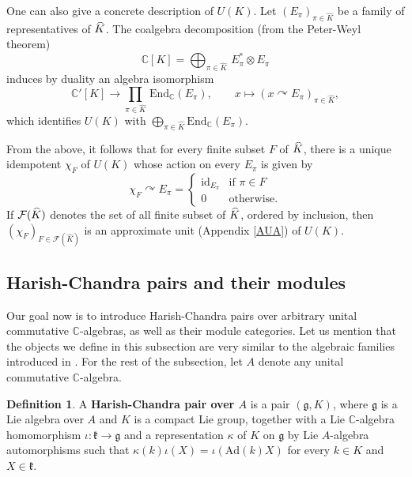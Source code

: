 \documentclass{amsart}
\theoremstyle{definition}
\newtheorem{definition}[theorem]{Definition}
\newcommand{\hatcpt}[1]{
  \vphantom{#1}\smash[t]{\widehat{#1}}
}
\begin{document}
One can also give a concrete description of $U(K)$. Let $(E_\pi)_{\pi \in \widehat{K}}$ be a family of representatives of $\hatcpt{K}$. The coalgebra decomposition (from the Peter-Weyl theorem)
\[
    \mathbb{C}[K] = \bigoplus_{\pi \in \widehat{K}}\, E_\pi^* \otimes E_\pi
\]
induces by duality an algebra isomorphism
\[ \mathbb{C}'[K] \to \prod_{\pi \in \widehat{K}} \, \mathrm{End}_\mathbb{C}(E_\pi),\qquad x \mapsto (x \curvearrowright E_\pi)_{\pi \in \widehat{K}},\]
which identifies $U(K)$ with $\bigoplus_{\pi \in \widehat{K}} \mathrm{End}_\mathbb{C}(E_\pi)$.

From the above, it follows that for every finite subset $F$ of $\hatcpt{K}$, there is a unique idempotent $\chi_F$ of $U(K)$ whose action on every $E_\pi$ is given by
\begin{equation}\chi_F \curvearrowright E_\pi = \begin{cases}
    \mathrm{id}_{E_\pi} & \text{if $\pi \in F$}\\
    0 & \text{otherwise.}
\end{cases}\end{equation}
If $\mathcal{F}(\hatcpt{K})$ denotes the set of all finite subset of $\hatcpt{K}$, ordered by inclusion, then $(\chi_{F})_{F \in \mathcal{F}(\widehat{K})}$ is an approximate unit (Appendix \ref{AUA}) of $U(K)$.

\subsection{Harish-Chandra pairs and their modules}\label{gKmods} Our goal now is to introduce Harish-Chandra pairs over arbitrary unital commutative $\mathbb{C}$-algebras, as well as their module categories. Let us mention that the objects we define in this subsection are very similar to the algebraic families introduced in \cite{BHS}. For the rest of the subsection, let $A$ denote any unital commutative $\mathbb{C}$-algebra.

\begin{definition}
    A \textbf{Harish-Chandra pair over $A$} is a pair $(\mathfrak{g},K)$, where $\mathfrak{g}$ is a Lie algebra over $A$ and $K$ is a compact Lie group, together with a Lie $\mathbb{C}$-algebra homomorphism $\iota : \mathfrak{k} \to \mathfrak{g}$ and a representation $\kappa$ of $K$ on $\mathfrak{g}$ by Lie $A$-algebra automorphisms such that $\kappa(k) \iota(X) = \iota(\mathrm{Ad}(k)X)$ for every $k \in K$ and $X\in \mathfrak{k}$.
\end{definition}
\end{document}
